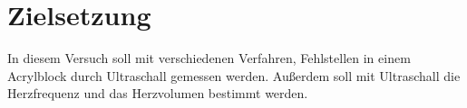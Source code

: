 \section{Zielsetzung}

\label{sec:Zielsetzung}
In diesem Versuch soll mit verschiedenen Verfahren, Fehlstellen in einem Acrylblock durch Ultraschall gemessen werden.
Außerdem soll mit Ultraschall die Herzfrequenz und das Herzvolumen bestimmt werden.
